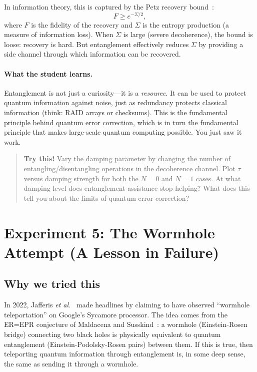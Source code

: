\documentclass[amsmath,amssymb,reprint,aps,prb]{revtex4-2}
\begin{document}
In information theory, this is captured by the Petz recovery
bound~\cite{Petz1986,Petz1988,Wilde2015}:
\begin{equation}\label{eq:petz_bound}
F \geq e^{-\Sigma/2},
\end{equation}
where $F$ is the fidelity of the recovery and $\Sigma$ is the
entropy production (a measure of information loss).  When $\Sigma$
is large (severe decoherence), the bound is loose: recovery is
hard.  But entanglement effectively reduces $\Sigma$ by providing
a side channel through which information can be recovered.

\paragraph{What the student learns.}
Entanglement is not just a curiosity---it is a \emph{resource}.
It can be used to protect quantum information against noise, just as
redundancy protects classical information (think: RAID arrays or
checksums).  This is the fundamental principle behind quantum error
correction, which is in turn the fundamental principle that makes
large-scale quantum computing possible.  You just saw it work.

\begin{quote}
\textbf{Try this!}  Vary the damping parameter by changing the
number of entangling/disentangling operations in the decoherence
channel.  Plot $\tau$ versus damping strength for both the $N=0$
and $N=1$ cases.  At what damping level does entanglement assistance
stop helping?  What does this tell you about the limits of
quantum error correction?
\end{quote}


\section{Experiment 5: The Wormhole Attempt (A Lesson in Failure)}
\label{sec:wormhole}

\subsection{Why we tried this}

In 2022, Jafferis \textit{et al.}~\cite{Jafferis2022} made
headlines by claiming to have observed ``wormhole teleportation''
on Google's Sycamore processor.  The idea comes from the ER=EPR
conjecture of Maldacena and Susskind~\cite{Maldacena2013}: a
wormhole (Einstein-Rosen bridge) connecting two black holes is
physically equivalent to quantum entanglement (Einstein-Podolsky-Rosen
pairs) between them.  If this is true, then teleporting quantum
information through entanglement is, in some deep sense, the same
as sending it through a wormhole.
\end{document}
